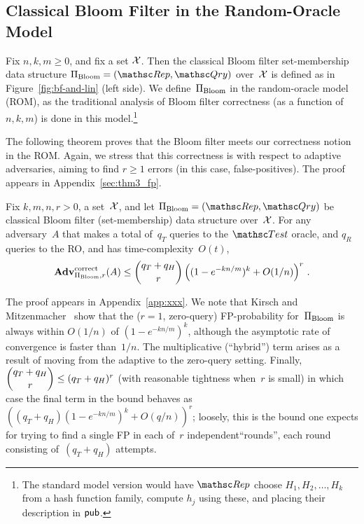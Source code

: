 \subsection{Classical Bloom Filter in the Random-Oracle Model}


Fix $n,k,m \geq 0$, and fix a set ${\cal X}$.  Then the classical Bloom
filter set-membership data structure $\setprim_{\mathrm{Bloom}}=
(\Rep, \Qry)$ over~${\cal X}$ is defined as in
Figure~\ref{fig:bf-and-lin} (left side).  We
define~$\Pi_{\mathrm{Bloom}}$ in the random-oracle model
(ROM), as the traditional analysis of Bloom filter correctness (as a
function of $n,k,m$) is done in this model.\footnote{The standard
model version would have $\Rep$ choose $H_1,H_2,\ldots,H_k$ from a
hash function family, compute $h_j$ using these, and placing their
description in ${\sf pub}$.}

 The following theorem proves that the Bloom
filter meets our correctness notion in the ROM.  Again, we stress
that this correctness is with respect to adaptive adversaries,
aiming to find $r \geq 1$ errors (in this case, false-positives).
The proof appears in Appendix~\ref{sec:thm3_fp}. 

\begin{theorem}\label{thm3}\label{thm:bf-correctness}
Fix $k,m,n,r>0$, a set~${\cal X}$, and let $\setprim_{\mathrm{Bloom}}= (\Rep, \Qry)$ be classical Bloom filter (set-membership) data structure over~${\cal X}$. For any adversary~$A$ that makes a total of~$q_T$ queries to the $\Test$ oracle, and $q_R$ queries to the RO, and has time-complexity~$O(t)$,
\[
\mathrm{\mathbf{Adv}}^{\mathrm{correct}}_{\Pi_{\mathrm{Bloom}},r}(A) \leq  {\dbinom{q_T + q_H}{r}} \left( (1-e^{-kn/m})^k + O(1/n) \right)^r\,.
\]
\end{theorem}
The proof appears in Appendix~\ref{app:xxx}.  We note that Kirsch and Mitzenmacher~\cite{xxx} show
that the ($r=1$, zero-query) FP-probability for~$\Pi_\mathrm{Bloom}$ is
always within $O(1/n)$ of $(1-e^{-kn/m})^k$, although the asymptotic
rate of convergence is faster than~$1/n$.  The multiplicative (``hybrid'') term arises as a result
of moving from the adaptive to the zero-query setting.
Finally, $\dbinom{q_T+q_H}{r} \leq (q_T+q_H)^r$ (with reasonable tightness when~$r$ is small) in
which case the final term in the bound behaves as
$((q_T+q_H) (1-e^{-kn/m})^k + O(q/n) )^r$; loosely, this is the bound one expects for
trying to find a single FP in each of~$r$ independent``rounds'', each round
consisting of~$(q_T+q_H)$ attempts.
%

